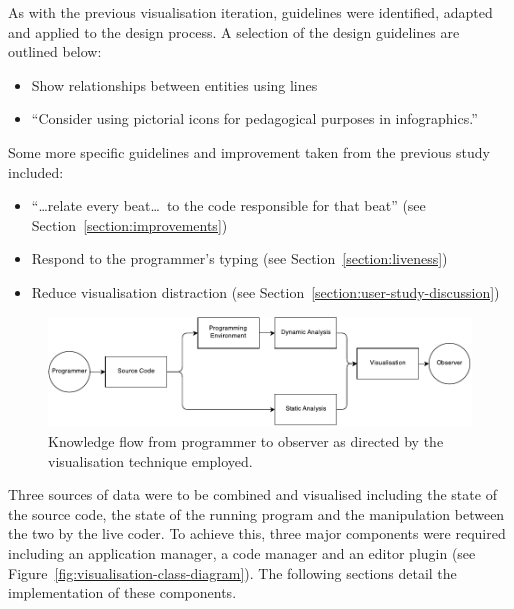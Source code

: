 As with the previous visualisation iteration, guidelines were identified, adapted and applied to the design process. A selection of the design guidelines are outlined below:

\begin{itemize}
\item Show relationships between entities using lines \cite[p.~183]{Ware2013a}~
\item ``Consider using pictorial icons for pedagogical purposes in infographics.'' \cite[p.~320]{Ware2013a}~
\end{itemize}

Some more specific guidelines and improvement taken from the previous study included:

\begin{itemize}
\item ``\ldots relate every beat\ldots~to the code responsible for that beat'' (see Section~\ref{section:improvements})~
\item Respond to the programmer's typing (see Section~\ref{section:liveness})~
\item Reduce visualisation distraction (see Section~\ref{section:user-study-discussion})~

\end{itemize}



\begin{figure}
  \centering \includegraphics[width=\columnwidth]{../images/diagrams/knowledge-flow-refined.pdf}
  \caption{Knowledge flow from programmer to observer as directed by the visualisation technique employed.}
\label{fig:knowledge-flow-refined}
\end{figure}

Three sources of data were to be combined and visualised including the state of the source code, the state of the running program and the manipulation between the two by the live coder. To achieve this, three major components were required including an application manager, a code manager and an editor plugin (see Figure~\ref{fig:visualisation-class-diagram}). The following sections detail the implementation of these components.

